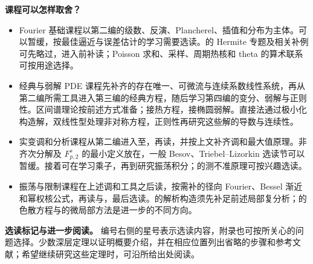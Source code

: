 \ProseParagraphBreak
\noindent\textbf{课程可以怎样取舍？}
\begin{itemize}
\item Fourier 基础课程以第二编的级数、反演、Plancherel、插值和分布为主体。可以暂缓，按最佳逼近与误差估计的学习需要选读。的 Hermite 专题及相关补例可先略过，进入前补读；Poisson 求和、采样、周期热核和 theta 的算术联系可按用途选择。
\item 经典与弱解 PDE 课程先补齐的存在唯一、可微流与连续系数线性系统，再从第二编所需工具进入第三编的经典方程，随后学习第四编的变分、弱解与正则性。区间谱理论按前述方式准备；接热方程，接椭圆弱解。直接法通过极小化构造解，双线性型处理非对称方程，正则性再研究这些解的导数与连续性。
\item 实变调和分析课程从第二编进入至，再读，并按上文补齐调和最大值原理。非齐次分解及 \(F^s_{p,2}\) 的最小定义放在，一般 Besov、Triebel--Lizorkin 选读节可以暂缓。接着可在学习乘子，再到研究振荡积分；的测不准原理可按兴趣选读。
\item 振荡与限制课程在上述调和工具之后读，按需补的径向 Fourier、Bessel 渐近和幂权核公式，再读与，最后选读。的解析构造须先补足前述局部复分析；的色散方程与的微局部方法是进一步的不同方向。
\end{itemize}

\ProseParagraphBreak
\noindent\textbf{选读标记与进一步阅读。}
编号右侧的星号表示选读内容，附录也可按所关心的问题选择。少数深层定理以证明概要介绍，并在相应位置列出省略的步骤和参考文献；希望继续研究这些定理时，可沿所给出处阅读。
